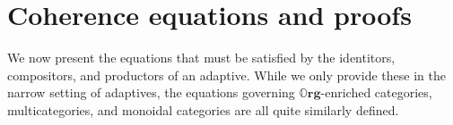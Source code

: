 \documentclass[11pt, one side, article]{memoir}
\theoremstyle{definition}
\theoremstyle{plain}
\newtheorem{theorem}[definitionx]{Theorem}
\newcommand{\Cat}[1]{\mathbf{#1}}%
\newcommand{\0}{\textsf{0}}
\newcommand{\1}{\tn{\textsf{1}}}
\newcommand{\org}{{\mathbb{O}\Cat{rg}}}
\newcommand{\bnote}[1]{{\color{red}Brandon says:}~#1.\quad{\color{red}$\lozenge$}}
\begin{document}
%
%
%
%




\appendix
\chapter{Coherence equations and proofs}\label{coherenceproofs}


We now present the equations that must be satisfied by the identitors, compositors, and productors of an adaptive. While we only provide these in the narrow setting of adaptives, the equations governing $\org$-enriched categories, multicategories, and monoidal categories are all quite similarly defined.
\end{document}
